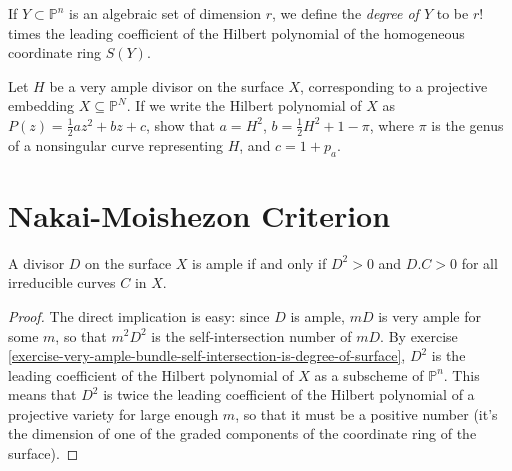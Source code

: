 \begin{definition}
\label{definition-degree-of-projective-variety}
\begin{reference}
\cite[p. 52]{hart}
\end{reference}
If $Y\subset \mathbb{P}^n$ is an algebraic set of dimension $r$, we define the
{\it degree of $Y$} to be $r!$ times the leading coefficient of the Hilbert
polynomial of the homogeneous coordinate ring $S(Y)$.
\end{definition}

\begin{exercise}
\label{exercise-very-ample-bundle-self-intersection-is-degree-of-surface}
\begin{reference}
\cite[V, Exercise 1.2]{har}
\end{reference}
Let $H$ be a very ample divisor on the surface $X$, corresponding to a
projective embedding $X\subseteq\mathbb{P}^N$. If we write the Hilbert
polynomial of $X$ as $P(z)=\frac{1}{2}az^2+bz+c$, show that $a=H^2$,
$b=\frac{1}{2}H^2+1-\pi$, where $\pi$ is the genus of a nonsingular curve
representing $H$, and $c=1+p_a$.
\end{exercise}

\section{Nakai-Moishezon Criterion}
\label{section-Nakai-Moishezon-criterion}

\begin{theorem}
\label{theorem-Nakai-Moishezon-criterion}
\begin{reference}
\cite[V, Theorem 1.10]{hart}
\end{reference}
A divisor $D$ on the surface $X$ is ample if and only if $D^2>0$ and $D.C>0$ for
all irreducible curves $C$ in $X$.
\end{theorem}

\begin{proof}
The direct implication is easy: since $D$ is ample,  $mD$ is very ample for some
$m$, so that $m^2D^2$ is the self-intersection number of $mD$. By exercise
\ref{exercise-very-ample-bundle-self-intersection-is-degree-of-surface},
 $D^2$ is the leading coefficient of the Hilbert polynomial of $X$ as a 
subscheme of $\mathbb{P}^n$. This means that $D^2$ is twice the leading
coefficient of the Hilbert polynomial of a projective variety for large enough
$m$, so that it must be a positive number (it's the dimension of one of the
graded components of the coordinate ring of the surface).
\end{proof}

